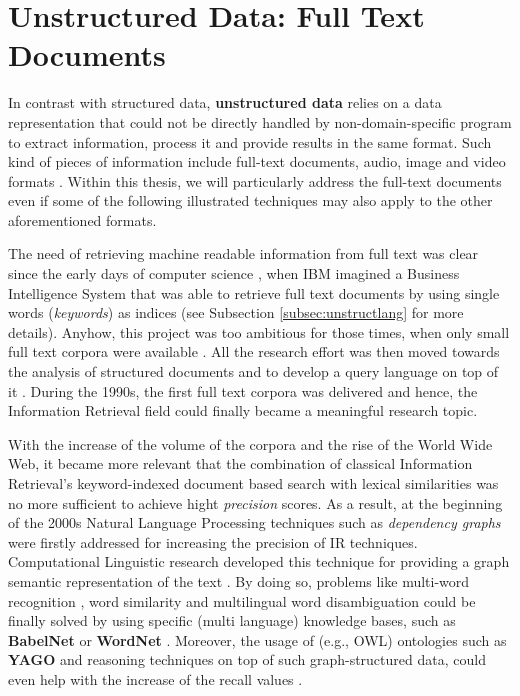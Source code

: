 \section{Unstructured Data: Full Text Documents}\label{sec:unstructured}
In contrast with structured data, \textbf{unstructured data} relies on a data representation that could not be directly handled by non-domain-specific program to extract information, process it and provide results in the same format. Such kind of pieces of information include full-text documents, audio, image and video formats \cite{SintSSF09}. Within this thesis, we will particularly address the full-text documents even if some of the following illustrated techniques may also apply to the other aforementioned formats.

The need of retrieving machine readable information from full text was clear since the early days of computer science  \cite{Luhn58}, when IBM imagined a Business Intelligence System that was able to retrieve full text documents by using single words (\textit{keywords}) as indices (see Subsection \vref{subsec:unstructlang} for more details). Anyhow, this project was too ambitious for those times, when only small full text corpora were available \cite{Singhal01}. All the research effort was then moved towards the analysis of structured documents and to develop a query language on top of it \cite{Codd71a}. During the 1990s, the first full text corpora was delivered \cite{nlacat} and hence, the Information Retrieval field could finally became a meaningful research topic. 

With the increase of the volume of the corpora and the rise of the World Wide Web, it became more relevant that the combination of classical Information Retrieval's  keyword-indexed document based search \cite{Manning} with lexical similarities \cite{KohailBiemann} was no more sufficient to achieve hight \textit{precision} scores. As a result, at the beginning of the 2000s \cite{Brants03} Natural Language Processing techniques such as \textit{dependency graphs} were firstly addressed for increasing the precision of IR techniques. Computational Linguistic research developed this technique for providing a graph semantic representation of the text \cite{Iglesias}. By doing so, problems like multi-word recognition \cite{Lossio-Ventura2014}, word similarity \cite{SemSim} and multilingual word disambiguation \cite{MultiWordSense} could be finally solved by using specific (multi language) knowledge bases, such as \textbf{BabelNet} \cite{Navigli12} or \textbf{WordNet} \cite{WordNet}. Moreover, the usage of (e.g., OWL) ontologies such as \textbf{YAGO} \cite{IBMWatson} and reasoning techniques on top of such graph-structured data, could even help with the increase of the recall values \cite{WeltyM06}. 

